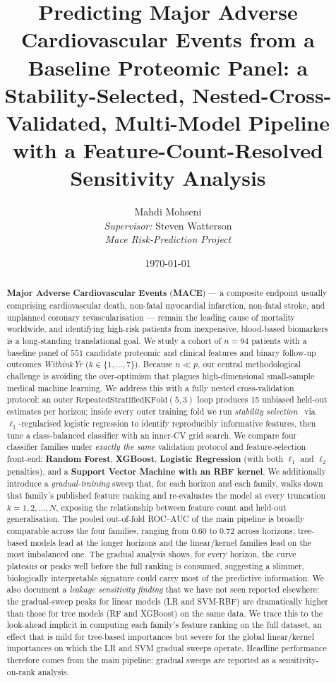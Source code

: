 \documentclass[11pt,a4paper]{article}
\title{\textbf{Predicting Major Adverse Cardiovascular Events from a Baseline
Proteomic Panel: a Stability-Selected, Nested-Cross-Validated, Multi-Model
Pipeline with a Feature-Count-Resolved Sensitivity Analysis}}
\author{
  Mahdi Mohseni \\[2pt]
  \small\textit{Supervisor:} Steven Watterson \\[2pt]
  \small\textit{Mace Risk-Prediction Project}
}
\date{\today}
\begin{document}
\maketitle

\begin{abstract}
\noindent
\textbf{Major Adverse Cardiovascular Events} (\textbf{MACE}) --- a
composite endpoint usually comprising cardiovascular death, non-fatal
myocardial infarction, non-fatal stroke, and unplanned coronary
revascularisation --- remain the leading cause of mortality
worldwide, and identifying high-risk patients from inexpensive, blood-based
biomarkers is a long-standing translational goal. We study a cohort of
$n=94$ patients with a baseline panel of $551$ candidate proteomic and
clinical features and binary follow-up outcomes \emph{Within$k$Yr}
($k\in\{1,\dots,7\}$). Because $n \ll p$, our central methodological
challenge is avoiding the over-optimism that plagues high-dimensional
small-sample medical machine learning. We address this with a fully nested
cross-validation protocol: an outer
$\mathrm{RepeatedStratifiedKFold}(5,3)$ loop produces 15 unbiased
held-out estimates per horizon; inside every outer training fold we run
\emph{stability selection}~\cite{} via $\ell_1$-regularised logistic
regression to identify reproducibly informative features, then tune a
class-balanced classifier with an inner-CV grid search. We compare four
classifier families under \emph{exactly the same} validation protocol and
feature-selection front-end: \textbf{Random Forest}, \textbf{XGBoost},
\textbf{Logistic Regression} (with both $\ell_1$ and $\ell_2$ penalties),
and a \textbf{Support Vector Machine with an RBF kernel}. We additionally
introduce a \emph{gradual-training} sweep that, for each horizon and each
family, walks down that family's published feature ranking and
re-evaluates the model at every truncation $k=1,2,\dots,N$, exposing the
relationship between feature count and held-out generalisation. The pooled
out-of-fold ROC--AUC of the main pipeline is broadly comparable across the
four families, ranging from $0.60$ to $0.72$ across horizons; tree-based
models lead at the longer horizons and the linear/kernel families lead on
the most imbalanced one. The gradual analysis shows, for every horizon,
the curve plateaus or peaks well before the full ranking is consumed,
suggesting a slimmer, biologically interpretable signature could carry
most of the predictive information. We also document a \emph{leakage
sensitivity finding} that we have not seen reported elsewhere: the
gradual-sweep peaks for linear models (LR and SVM-RBF) are dramatically
higher than those for tree models (RF and XGBoost) on the same data. We
trace this to the look-ahead implicit in computing each family's feature
ranking on the full dataset, an effect that is mild for tree-based
importances but severe for the global linear/kernel importances on which
the LR and SVM gradual sweeps operate. Headline performance therefore
comes from the main pipeline; gradual sweeps are reported as a
sensitivity-on-rank analysis.
\end{abstract}
\end{document}
